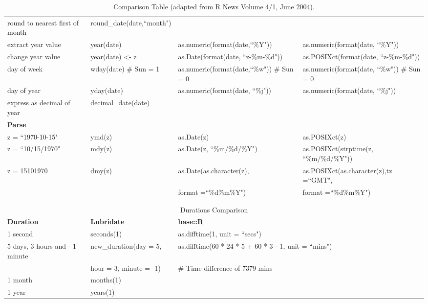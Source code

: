 \documentclass[article]{jss}
\begin{document}
\begin{table}
\begin{center}
\begin{tabular}{llll}
round to nearest first of month & round\_date(date,``month") & & \\
extract year value & year(date) & as.numeric(format(date,``\%Y")) & as.numeric(format(date, ``\%Y"))\\
change year value & year(date) \textless- z & as.Date(format(date, ``z-\%m-\%d")) & as.POSIXct(format(date, ``z-\%m-\%d"))\\
day of week & wday(date) \# Sun = 1 & as.numeric(format(date,``\%w")) \# Sun = 0 & as.numeric(format(date, ``\%w")) \# Sun = 0\\
day of year & yday(date) & as.numeric(format(date, ``\%j")) & as.numeric(format(date, ``\%j"))\\
express as decimal of year & decimal\_date(date) & & \\
\midrule
\bf{Parse} & & &\\
\cmidrule{1-1}
z = ``1970-10-15" & ymd(z) & as.Date(z) & as.POSIXct(z)\\
z = ``10/15/1970" & mdy(z) & as.Date(z, ``\%m/\%d/\%Y") & as.POSIXct(strptime(z, ``\%m/\%d/\%Y"))\\
z = 15101970  & dmy(z) & as.Date(as.character(z), & as.POSIXct(as.character(z),tz =``GMT",\\ 
& & \hspace{3mm} format =``\%d\%m\%Y") & \hspace{3mm} format =``\%d\%m\%Y")\\
\bottomrule
\multicolumn{4}{c}{    } \\
\multicolumn{4}{c}{    } \\
\multicolumn{4}{c}{Durations Comparison}\\
\toprule
\bf{Duration} & \bf{Lubridate} & \multicolumn{2}{l}{\bf{base::R}}\\
\midrule
1 second & seconds(1) & \multicolumn{2}{l}{as.difftime(1, unit = ``secs")}\\
5 days, 3 hours and - 1 minute & new\_duration(day = 5,  & \multicolumn{2}{l}{as.difftime(60 * 24 * 5 + 60 * 3 - 1, unit = ``mins")}\\
& \hspace{2mm} hour = 3, minute = -1) & \multicolumn{2}{l}{\# Time difference of 7379 mins}\\
1 month & months(1) & \multicolumn{2}{l}{}\\
1 year & years(1) & \multicolumn{2}{l}{}\\
\bottomrule



\end{tabular}
\caption{Comparison Table (adapted from R News Volume 4/1, June 2004).}
\label{comparison}
\end{center}
\end{table}%
\end{document}
